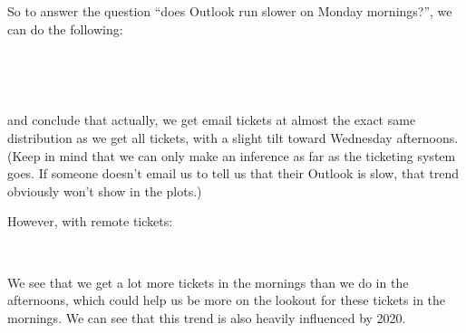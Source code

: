 \documentclass[11pt]{article}
\begin{document}
    So to answer the question ``does Outlook run slower on Monday
mornings?'', we can do the following:


    \begin{center}
    \end{center}
    { \hspace*{\fill} \\}
    

    \begin{center}
    \end{center}
    { \hspace*{\fill} \\}
    
    and conclude that actually, we get email tickets at almost the exact
same distribution as we get all tickets, with a slight tilt toward
Wednesday afternoons. (Keep in mind that we can only make an inference
as far as the ticketing system goes. If someone doesn't email us to tell
us that their Outlook is slow, that trend obviously won't show in the
plots.)

However, with remote tickets:

    \begin{center}
    \end{center}
    { \hspace*{\fill} \\}
    
    We see that we get a lot more tickets in the mornings than we do in the
afternoons, which could help us be more on the lookout for these tickets
in the mornings. We can see that this trend is also heavily influenced
by 2020.

    \begin{center}
    \end{center}
    { \hspace*{\fill} \\}
    

    \begin{center}
    \end{center}
    { \hspace*{\fill} \\}
    
\end{document}
